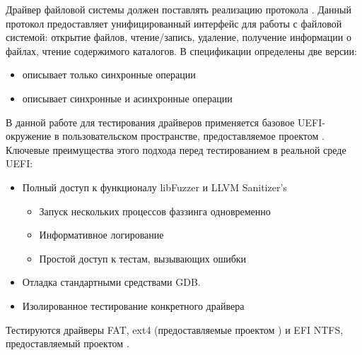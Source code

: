  Драйвер файловой системы должен поставлять реализацию протокола . Данный протокол предоставляет унифицированный интерфейс для работы с файловой системой: открытие файлов, чтение/запись, удаление, получение информации о файлах, чтение содержимого каталогов. В спецификации определены две версии:
 \begin{itemize}
 	\item {} описывает только синхронные операции 
 	\item {} описывает синхронные и асинхронные операции 
 \end{itemize}
 
В данной работе для тестирования драйверов применяется базовое UEFI-окружение в пользовательском пространстве, предоставляемое проектом  \cite{OpenCorePkg}. Ключевые преимущества этого подхода перед тестированием в реальной среде UEFI:
\begin{itemize}
	\item Полный доступ к функционалу libFuzzer и LLVM Sanitizer's
	\begin{itemize}
		\item Запуск нескольких процессов фаззинга  одновременно
		\item Информативное логирование
		\item Простой доступ к тестам, вызывающих ошибки
	\end{itemize}
	\item Отладка стандартными средствами GDB.
	\item Изолированное тестирование конкретного драйвера
\end{itemize}
 
 Тестируются драйверы FAT, ext4 (предоставляемые проектом  \cite{Audk}) и EFI NTFS, предоставляемый проектом \cite{OpenCorePkg}.  